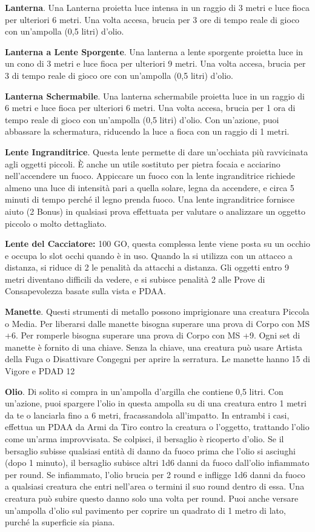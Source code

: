 \documentclass[12pt,a4paper,twoside,openany]{book}
\begin{document}
\begin{multicols}{2}
\textbf{Lanterna}. Una Lanterna proietta luce intensa in un raggio di 3 metri e luce fioca per ulteriori 6 metri. Una volta accesa, brucia per 3 ore di tempo reale di gioco con un’ampolla (0,5 litri) d’olio.

\textbf{Lanterna a Lente Sporgente}. Una lanterna a lente sporgente proietta luce in un cono di 3 metri e luce fioca per ulteriori 9 metri. Una volta accesa, brucia per 3 di tempo reale di gioco ore con un’ampolla (0,5 litri) d’olio.

\textbf{Lanterna Schermabile}. Una lanterna schermabile proietta luce in un raggio di 6 metri e luce fioca per ulteriori 6 metri. Una volta accesa, brucia per 1 ora di tempo reale di gioco con un’ampolla (0,5 litri) d’olio. Con un’azione, puoi abbassare la schermatura, riducendo la luce a fioca con un raggio di 1 metri.

\textbf{Lente Ingranditrice}. Questa lente permette di dare un’occhiata più ravvicinata agli oggetti piccoli. È anche un utile sostituto per pietra focaia e acciarino nell’accendere un fuoco. Appiccare un fuoco con la lente ingranditrice richiede almeno una luce di intensità pari a quella solare, legna da accendere, e circa 5 minuti di tempo perché il legno prenda fuoco. Una lente ingranditrice fornisce aiuto (2 Bonus) in qualsiasi prova effettuata per valutare o analizzare un oggetto piccolo o molto dettagliato. 

\textbf{Lente del Cacciatore:} 100 GO, questa complessa lente viene posta su un occhio e occupa lo slot occhi quando è in uso. Quando la si utilizza con un attacco a distanza, si riduce di 2 le penalità da attacchi a distanza. Gli oggetti entro 9 metri diventano difficili da vedere, e si subisce penalità 2 alle Prove di Consapevolezza basate sulla vista e PDAA.

\textbf{Manette}. Questi strumenti di metallo possono imprigionare una creatura Piccola o Media. Per liberarsi dalle manette bisogna superare una prova di Corpo con MS +6. Per romperle bisogna superare una prova di Corpo con MS +9. Ogni set di manette è fornito di una chiave. Senza la chiave, una creatura può usare Artista della Fuga o Disattivare Congegni per aprire la serratura. Le manette hanno 15 di Vigore e PDAD 12

\textbf{Olio}. Di solito si compra in un’ampolla d’argilla che contiene 0,5 litri. Con un’azione, puoi spargere l’olio in questa ampolla su di una creatura entro 1 metri da te o lanciarla fino a 6 metri, fracassandola all’impatto. In entrambi i casi, effettua un PDAA da Armi da Tiro contro la creatura o l’oggetto, trattando l’olio come un’arma improvvisata. Se colpisci, il bersaglio è ricoperto d’olio. Se il bersaglio subisse qualsiasi entità di danno da fuoco prima che l’olio si asciughi (dopo 1 minuto), il bersaglio subisce altri 1d6 danni da fuoco dall’olio infiammato per round. Se infiammato, l’olio brucia per 2 round e infligge 1d6 danni da fuoco a qualsiasi creatura che entri nell’area o termini il suo round dentro di essa. Una creatura può subire questo danno solo una volta per round. Puoi anche versare un’ampolla d’olio sul pavimento per coprire un quadrato di 1 metro di lato, purché la superficie sia piana.


\end{multicols}
\end{document}
